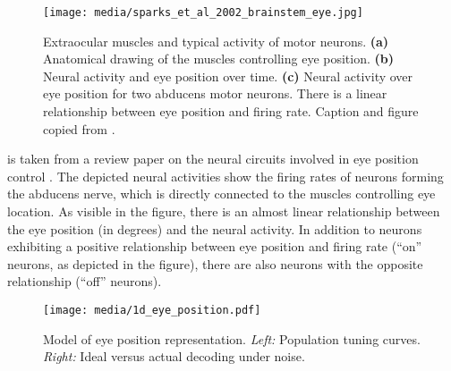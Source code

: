 \documentclass[10pt,letterpaper,oneside]{article}
\begin{document}
\begin{figure}
	\texttt{[image: media/sparks\_et\_al\_2002\_brainstem\_eye.jpg]}
	\caption{Extraocular muscles and typical activity of motor neurons. \textbf{(a)} Anatomical drawing of the muscles controlling eye position. \textbf{(b)} Neural activity and eye position over time. \textbf{(c)} Neural activity over eye position for two abducens motor neurons. There is a linear relationship between eye position and firing rate. Caption and figure copied from \cite{sparks2002brainstem}.}
	\label{fig:sparks_et_al_2002_brainstem_eye}
\end{figure}

 is taken from a review paper on the neural circuits involved in eye position control \cite{sparks2002brainstem}. The depicted neural activities show the firing rates of neurons forming the abducens nerve, which is directly connected to the muscles controlling eye location. As visible in the figure, there is an almost linear relationship between the eye position (in degrees) and the neural activity. In addition to neurons exhibiting a positive relationship between eye position and firing rate (\enquote{on} neurons, as depicted in the figure), there are also neurons with the opposite relationship (\enquote{off} neurons).

\begin{figure}
	\centering
	\texttt{[image: media/1d\_eye\_position.pdf]}
	\caption{Model of eye position representation. \emph{Left:} Population tuning curves. \emph{Right:} Ideal versus actual decoding under noise. }
	\label{fig:1d_eye_position}
\end{figure}
\end{document}
